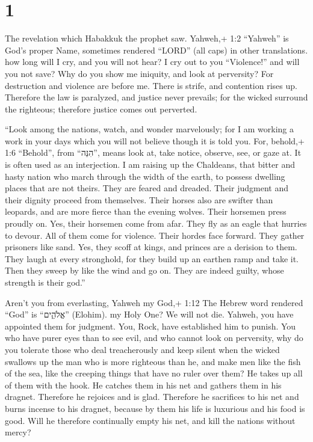\hypertarget{section}{%
\section{1}\label{section}}

 The revelation which Habakkuk the prophet saw. 
Yahweh,+ 1:2 ``Yahweh'' is God's proper Name, sometimes rendered
``LORD'' (all caps) in other translations. how long will I cry, and you
will not hear? I cry out to you ``Violence!'' and will you not save?
 Why do you show me iniquity, and look at perversity? For
destruction and violence are before me. There is strife, and contention
rises up.  Therefore the law is paralyzed, and justice never
prevails; for the wicked surround the righteous; therefore justice comes
out perverted.

 ``Look among the nations, watch, and wonder marvelously;
for I am working a work in your days which you will not believe though
it is told you.  For, behold,+ 1:6 ``Behold'', from
``הִנֵּה'', means look at, take notice, observe, see, or gaze at. It is
often used as an interjection. I am raising up the Chaldeans, that
bitter and hasty nation who march through the width of the earth, to
possess dwelling places that are not theirs.  They are
feared and dreaded. Their judgment and their dignity proceed from
themselves.  Their horses also are swifter than leopards,
and are more fierce than the evening wolves. Their horsemen press
proudly on. Yes, their horsemen come from afar. They fly as an eagle
that hurries to devour.  All of them come for violence.
Their hordes face forward. They gather prisoners like sand.
 Yes, they scoff at kings, and princes are a derision to
them. They laugh at every stronghold, for they build up an earthen ramp
and take it.  Then they sweep by like the wind and go on.
They are indeed guilty, whose strength is their god.''

 Aren't you from everlasting, Yahweh my God,+ 1:12 The
Hebrew word rendered ``God'' is ``אֱלֹהִ֑ים'' (Elohim). my Holy One? We
will not die. Yahweh, you have appointed them for judgment. You, Rock,
have established him to punish.  You who have purer eyes
than to see evil, and who cannot look on perversity, why do you tolerate
those who deal treacherously and keep silent when the wicked swallows up
the man who is more righteous than he,  and make men like
the fish of the sea, like the creeping things that have no ruler over
them?  He takes up all of them with the hook. He catches
them in his net and gathers them in his dragnet. Therefore he rejoices
and is glad.  Therefore he sacrifices to his net and burns
incense to his dragnet, because by them his life is luxurious and his
food is good.  Will he therefore continually empty his net,
and kill the nations without mercy?

